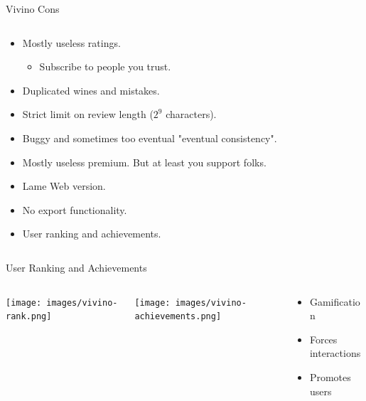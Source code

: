 \documentclass[presentation,aspectratio=169,smaller]{beamer}
\begin{document}
\begin{frame}[label={sec:orga7ae0c7}]{Vivino Cons}
\begin{columns}
\begin{column}{1.0\columnwidth}
\begin{itemize}
\item Mostly useless ratings.
\begin{itemize}
\item Subscribe to people you trust.
\end{itemize}
\item Duplicated wines and mistakes.
\item Strict limit on review length (\(2^9\) characters).
\item Buggy and sometimes too eventual "eventual consistency".
\item Mostly useless premium. But at least you support folks.
\item Lame Web version.
\item No export functionality.
\item User ranking and achievements.
\end{itemize}
\end{column}
\end{columns}
\end{frame}
\begin{frame}[label={sec:orgd6657c5}]{User Ranking and Achievements}
\begin{columns}
\begin{column}{0.3\columnwidth}
\begin{center}
\texttt{[image: images/vivino-rank.png]}
\end{center}
\end{column}
\begin{column}{0.3\columnwidth}
\begin{center}
\texttt{[image: images/vivino-achievements.png]}
\end{center}
\end{column}
\begin{column}{0.3\columnwidth}
\begin{itemize}
\item Gamification
\item Forces interactions
\item Promotes users
\end{itemize}
\end{column}
\end{columns}
\end{frame}
\end{document}
